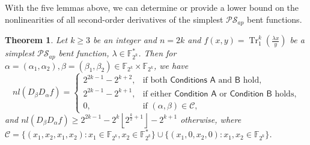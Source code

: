 \documentclass[preprint,10pt]{elsarticle}
\newcommand{\F}{\mathbb{F}}
\newcommand{\0}{\textbf{0}}
\newcommand{\1}{\textbf{1}}
\newcommand{\TRACE}{\operatorname{Tr}_1^k}
\theoremstyle{plain}
\newtheorem{theorem}{Theorem}
\begin{document}
    With the five lemmas above, we can determine or provide a lower bound on the nonlinearities of all second-order derivatives of the simplest $\mathcal{PS}_{ap}$ bent functions.
    \begin{theorem}\label{thm:nl_DaDbf}
        Let $k\ge 3$ be an integer and $n=2k$ and $f(x,y)=\TRACE\left(\frac{\lambda x}{y}\right)$ be a simplest $\mathcal{PS}_{ap}$ bent function, $\lambda\in\F_{2^k}^*$.
        Then for $\alpha=(\alpha_1,\alpha_2),\beta=(\beta_1,\beta_2)\in\F_{2^k}\times\F_{2^k}$, we have
        \begin{equation}\label{res:nontrivil_nl}
            nl(D_{\beta}D_{\alpha}f)=\begin{cases}
                2^{2k-1}-2^{k+2},&\text{if both }\hyperref[item_a]{\textsf{Conditions A}}\text{ and }\hyperref[item_b]{\textsf{B}} \text{ hold},\\
                2^{2k-1}-2^{k+1},&\text{if either }\hyperref[item_a]{\textsf{Condition A}}\text{ or }\hyperref[item_b]{\textsf{Condition B}}\text{ holds},\\
                0,&\text{if }(\alpha,\beta)\in \mathcal{C},%
            \end{cases}
        \end{equation}
        and $nl(D_{\beta}D_{\alpha}f)\ge 2^{2k-1}-2^k\left\lfloor 2^{\frac{k}{2}+1}\right\rfloor-2^{k+1}$ otherwise,
        where $\mathcal{C}=\{(x_1,x_2,x_1,x_2):x_1\in\F_{2^k},x_2\in\F_{2^k}^*\}\cup\{(x_1,0,x_2,0):x_1,x_2\in\F_{2^k}\}$.
    \end{theorem}
\end{document}
